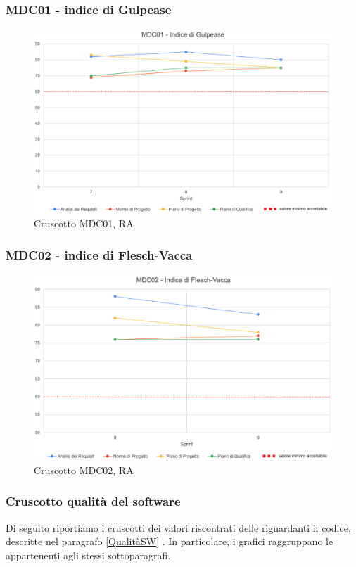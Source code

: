 \subsubsection*{MDC01 - indice di Gulpease}
\begin{figure}[H]
    \centering
    \includegraphics[scale = 0.6]{immagini/GulpeaseRQ.png}
    \caption{Cruscotto MDC01, RA}
\end{figure}

\subsubsection*{MDC02 - indice di Flesch-Vacca}
\begin{figure}[H]
    \centering
    \includegraphics[scale = 0.6]{immagini/fleschRQ.png}
    \caption{Cruscotto MDC02, RA}
\end{figure}
\newpage
\subsubsection{Cruscotto  qualità del software}
Di seguito riportiamo i cruscotti dei valori riscontrati delle  riguardanti il codice, descritte nel paragrafo \ref{QualitàSW} . In particolare, i grafici raggruppano le  appartenenti agli stessi sottoparagrafi.

